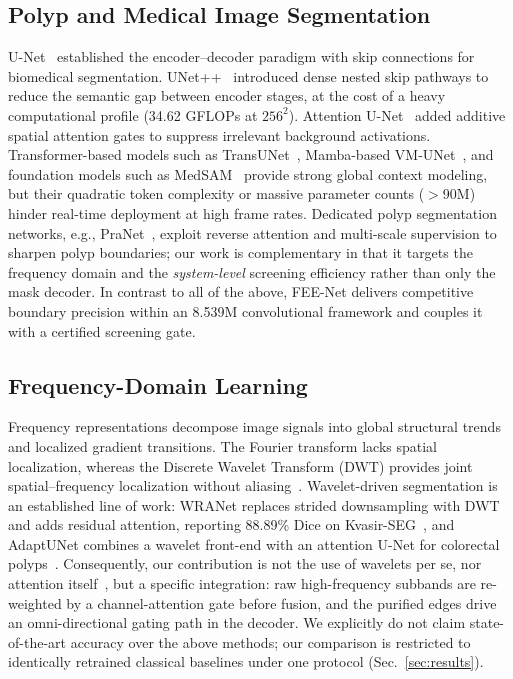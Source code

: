 \documentclass[journal]{IEEEtran}
\begin{document}
\subsection{Polyp and Medical Image Segmentation}
U-Net~\cite{ronneberger2015u} established the encoder--decoder paradigm with skip connections for biomedical segmentation. UNet++~\cite{zhou2019unetplusplus} introduced dense nested skip pathways to reduce the semantic gap between encoder stages, at the cost of a heavy computational profile (34.62 GFLOPs at $256^2$). Attention U-Net~\cite{oktay2018attention} added additive spatial attention gates to suppress irrelevant background activations. Transformer-based models such as TransUNet~\cite{chen2021transunet}, Mamba-based VM-UNet~\cite{ruan2024vmunet}, and foundation models such as MedSAM~\cite{ma2024medsam} provide strong global context modeling, but their quadratic token complexity or massive parameter counts ($>$90M) hinder real-time deployment at high frame rates. Dedicated polyp segmentation networks, e.g., PraNet~\cite{fan2020pranet}, exploit reverse attention and multi-scale supervision to sharpen polyp boundaries; our work is complementary in that it targets the frequency domain and the \emph{system-level} screening efficiency rather than only the mask decoder. In contrast to all of the above, FEE-Net delivers competitive boundary precision within an 8.539M convolutional framework and couples it with a certified screening gate.

\subsection{Frequency-Domain Learning}
Frequency representations decompose image signals into global structural trends and localized gradient transitions. The Fourier transform lacks spatial localization, whereas the Discrete Wavelet Transform (DWT) provides joint spatial--frequency localization without aliasing~\cite{ruan2024vmunet}. Wavelet-driven segmentation is an established line of work: WRANet replaces strided downsampling with DWT and adds residual attention, reporting 88.89\% Dice on Kvasir-SEG~\cite{zhao2023wranet}, and AdaptUNet combines a wavelet front-end with an attention U-Net for colorectal polyps~\cite{rajasekar2024adaptunet}. Consequently, our contribution is not the use of wavelets per se, nor attention itself~\cite{hu2018senet}, but a specific integration: raw high-frequency subbands are re-weighted by a channel-attention gate before fusion, and the purified edges drive an omni-directional gating path in the decoder. We explicitly do not claim state-of-the-art accuracy over the above methods; our comparison is restricted to identically retrained classical baselines under one protocol (Sec.~\ref{sec:results}).
\end{document}
